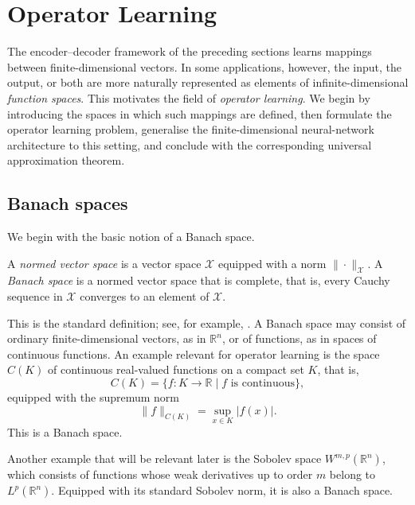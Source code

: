 


\section{Operator Learning}
\label{sec:operator_learning}

The encoder--decoder framework of the preceding sections learns mappings between finite-dimensional vectors. In some applications, however, the input, the output, or both are more naturally represented as elements of infinite-dimensional \emph{function spaces}. This motivates the field of \emph{operator learning}. We begin by introducing the spaces in which such mappings are defined, then formulate the operator learning problem, generalise the finite-dimensional neural-network architecture to this setting, and conclude with the corresponding universal approximation theorem.

\subsection{Banach spaces}

We begin with the basic notion of a Banach space.

\begin{definition}
A \emph{normed vector space} is a vector space $\mathcal{X}$ equipped with a norm $\|\cdot\|_{\mathcal{X}}$. A \emph{Banach space} is a normed vector space that is complete, that is, every Cauchy sequence in $\mathcal{X}$ converges to an element of $\mathcal{X}$.
\end{definition}

This is the standard definition; see, for example, \citet{Schilling2005}. A Banach space may consist of ordinary finite-dimensional vectors, as in $\mathbb{R}^n$, or of functions, as in spaces of continuous functions. An example relevant for operator learning is the space $C(K)$ of continuous real-valued functions on a compact set $K$, that is,
\[
    C(K)=\{f:K\to\mathbb{R}\mid f \text{ is continuous}\},
\]
equipped with the supremum norm
\[
    \|f\|_{C(K)} = \sup_{x \in K} |f(x)|.
\]
This is a Banach space.

Another example that will be relevant later is the Sobolev space $W^{m,p}(\mathbb{R}^n)$, which consists of functions whose weak derivatives up to order $m$ belong to $L^p(\mathbb{R}^n)$. Equipped with its standard Sobolev norm, it is also a Banach space.

